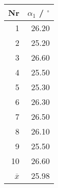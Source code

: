 \begin{tabular}{r|r}\\
 Nr & $\alpha_1$ / ${}^\circ$  \\
 \hline
1 & 26.20\\
2 & 25.20\\
3 & 26.60\\
4 & 25.50\\
5 & 25.30\\
6 & 26.30\\
7 & 26.50\\
8 & 26.10\\
9 & 25.50\\
10 & 26.60\\
\hline \
 $\overline{x}$ & 25.98
\end{tabular}